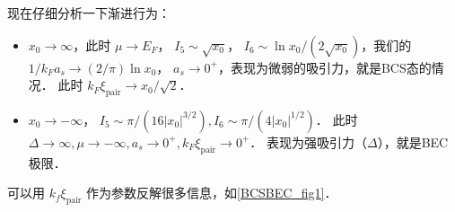 现在仔细分析一下渐进行为：

\begin{itemize}
\item $x_0\to\infty$，此时 $\mu\to E_F$， $I_5\sim\sqrt{x_0}$， $I_6\sim\ln x_0/(2\sqrt{x_0})$，我们的 $1/k_Fa_s\to(2/\pi)\ln x_0$， $a_s\to0^+$，表现为微弱的吸引力，就是BCS态的情况． 此时 $k_F\xi_{\text{pair}}\to x_0/\sqrt2$．
\item $x_0\to-\infty$， $I_5\sim\pi/(16|x_0|^{3/2}), I_6\sim\pi/(4|x_0|^{1/2})$． 此时 $\Delta\to\infty, \mu\to-\infty, a_s\to0^+,k_F\xi_{\text{pair}}\to0^+$． 表现为强吸引力（$\Delta$），就是BEC极限．
\end{itemize}

可以用 $k_f\xi_{\text{pair}}$ 作为参数反解很多信息，如\autoref{BCSBEC_fig1}．


